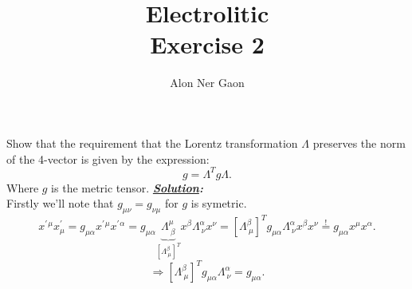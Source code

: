 \documentclass[notitlepage]{report}
\title{\Huge{Electrolitic}\\Exercise 2}
\author{Alon Ner Gaon}
\begin{document}
\maketitle

\begin{question}[title = Question 1.2]{}{}
Show that the requirement that the Lorentz transformation $\Lambda$ preserves the norm of the 4-vector is given by the expression:\\
\[
	g=\Lambda^Tg\Lambda
.\] 
Where $g$ is the metric tensor.
\tcblower
\textbf{\emph{\underline{Solution}:}}\\
Firstly we'll note that $g_{\mu\nu}=g_{\nu\mu}$ for $g$ is symetric.\\
\[
	x^\prime{}^{\mu} x^\prime_\mu = g_{\mu\alpha}x^\prime{}^\mu x^\prime{}^{\alpha}=g_{\mu\alpha}\underbrace{\Lambda^\mu_{\ \beta}}_{\left[\Lambda^\beta_{\ \mu}\right]^T }x^\beta\Lambda^\alpha_{\ \nu}x^\nu=\left[\Lambda^\beta_{\ \mu}\right]^Tg_{\mu\alpha}\Lambda^\alpha_{\ \nu}x^\beta x^\nu\overset{!}{=}g_{\mu\alpha}x^\mu x^{\alpha}
.\] 
\[
	\Rightarrow\boxed{ \left[\Lambda^\beta_{\ \mu}\right]^Tg_{\mu\alpha}\Lambda^\alpha_{\ \nu}=g_{\mu\alpha}}
.\] 
\end{question}
\end{document}
